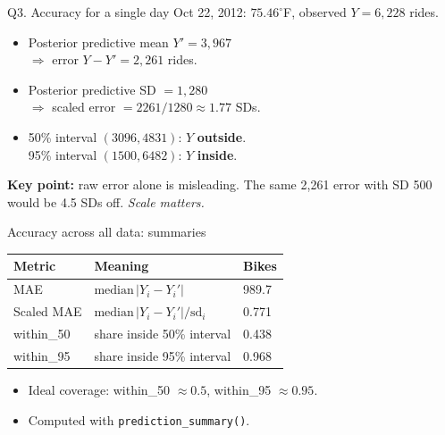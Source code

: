 \documentclass[aspectratio=43,11pt]{beamer}
\begin{document}
\begin{frame}{Q3. Accuracy for a single day}
  Oct 22, 2012: $75.46^\circ$F, observed $Y = 6{,}228$ rides.
  \vspace{0.4em}
  \begin{itemize}
    \item Posterior predictive mean $Y' = 3{,}967$ \\
      $\Rightarrow$ error $Y - Y' = 2{,}261$ rides.
    \item Posterior predictive SD $= 1{,}280$ \\
      $\Rightarrow$ scaled error $= 2261/1280 \approx 1.77$ SDs.
    \item 50\% interval $(3096, 4831)$: $Y$ \textbf{outside}. \\
          95\% interval $(1500, 6482)$: $Y$ \textbf{inside}.
  \end{itemize}
  \vspace{0.4em}
  \textbf{Key point:} raw error alone is misleading. The same 2,261 error
  with SD 500 would be 4.5 SDs off. \emph{Scale matters.}
\end{frame}

\begin{frame}{Accuracy across all data: summaries}
  \centering
  \begin{tabular}{@{}lll@{}}
    \toprule
    Metric & Meaning & Bikes \\
    \midrule
    MAE & $\text{median}\,|Y_i - Y_i'|$ & 989.7 \\
    Scaled MAE & $\text{median}\,|Y_i - Y_i'|/\text{sd}_i$ & 0.771 \\
    within\_50 & share inside 50\% interval & 0.438 \\
    within\_95 & share inside 95\% interval & 0.968 \\
    \bottomrule
  \end{tabular}
  \vspace{0.8em}
  \raggedright
  \begin{itemize}
    \item Ideal coverage: within\_50 $\approx 0.5$, within\_95 $\approx 0.95$.
    \item Computed with \texttt{prediction\_summary()}.
  \end{itemize}
\end{frame}
\end{document}

